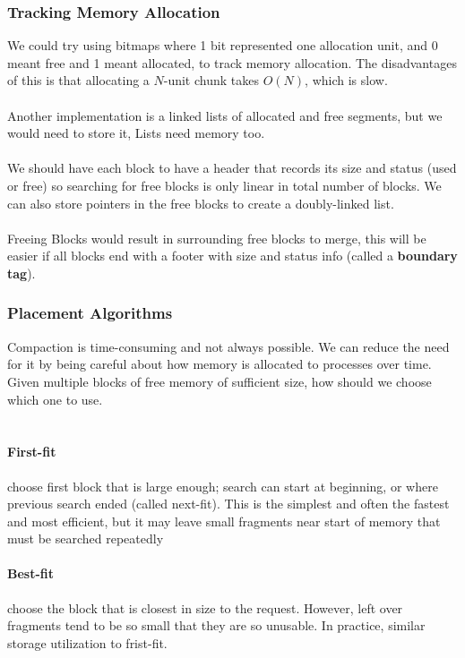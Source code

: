 \documentclass{article}
\begin{document}
\subsubsection{Tracking Memory Allocation}

We could try using bitmaps where 1 bit represented one allocation unit, and 0 meant free and 1 meant allocated, to track memory allocation. The disadvantages of this is that allocating a $N$-unit chunk takes $O(N)$, which is slow.\\
\\
Another implementation is a linked lists of allocated and free segments, but we would need to store it, Lists need memory too.\\
\\
We should have each block to have a header that records its size and status (used or free) so searching for free blocks is only linear in total number of blocks. We can also store pointers in the free blocks to create a doubly-linked list.\\
\\
Freeing Blocks would result in surrounding free blocks to merge, this will be easier if all blocks end with a footer with size and status info (called a \textbf{boundary tag}).

\subsubsection{Placement Algorithms}

Compaction is time-consuming and not always possible. We can reduce the need for it by being careful about how memory is allocated to processes over time. Given multiple blocks of free memory of sufficient size, how should we choose which one to use.\\
\\
\paragraph{First-fit} choose first block that is large enough; search can start at beginning, or where previous search ended (called next-fit). This is the simplest and often the fastest and most efficient, but it may leave small fragments near start of memory that must be searched repeatedly

\paragraph{Best-fit} choose the block that is closest in size to the request. However, left over fragments tend to be so small that they are so unusable. In practice, similar storage utilization to frist-fit.
\end{document}
